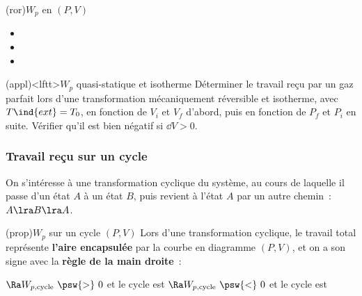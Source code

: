 \documentclass[../../main/main.tex]{subfiles}
\begin{document}
\begin{tcb*}(ror){$W_p$ en $(P,V)$}
	\begin{itemize}
		\item {}
		\item {}
		\item {}
	\end{itemize}
\end{tcb*}

\begin{tcb*}(appl)<lftt>{$W_p$ quasi-statique et isotherme}
	Déterminer le travail reçu par un gaz parfait lors d'une transformation
	mécaniquement réversible et isotherme, avec $T\ind{ext} = T_0$, en fonction de
	$V_i$ et $V_f$ d'abord, puis en fonction de $P_f$ et $P_i$ en suite. Vérifier
	qu'il est bien négatif si $\dd{V} > 0$.
	\tcblower
\end{tcb*}

\subsubsection{Travail reçu sur un cycle}
On s'intéresse à une transformation cyclique du système, au cours de laquelle il
passe d'un état $A$ à un état $B$, puis revient à l'état $A$ par un autre
chemin~: $A \lra B \lra A$.

\begin{tcb*}(prop){$W_p$ sur un cycle $(P,V)$}
	Lors d'une transformation cyclique, le travail total représente \textbf{l'aire
		encapsulée} par la courbe en diagramme $(P,V)$, et on a son signe avec la
	\textbf{règle de la main droite}~:
	\begin{itemize}
		 $\Ra W_{p,\rm cycle}~\psw{>}~0$ et le cycle est
		 $\Ra W_{p,\rm cycle}~\psw{<}~0$ et le cycle est
	\end{itemize}
\end{tcb*}
\end{document}
